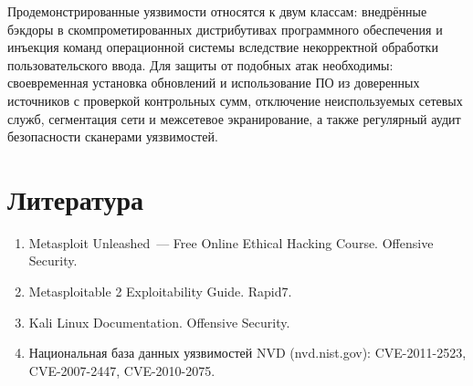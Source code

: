 \documentclass[a4paper,14pt]{extarticle}
\begin{document}
Продемонстрированные уязвимости относятся к двум классам: внедрённые бэкдоры в скомпрометированных дистрибутивах программного обеспечения и инъекция команд операционной системы вследствие некорректной обработки пользовательского ввода. Для защиты от подобных атак необходимы: своевременная установка обновлений и использование ПО из доверенных источников с проверкой контрольных сумм, отключение неиспользуемых сетевых служб, сегментация сети и межсетевое экранирование, а также регулярный аудит безопасности сканерами уязвимостей.

\section{Литература}

\begin{enumerate}
\item Metasploit Unleashed~--- Free Online Ethical Hacking Course. Offensive Security.
\item Metasploitable 2 Exploitability Guide. Rapid7.
\item Kali Linux Documentation. Offensive Security.
\item Национальная база данных уязвимостей NVD (nvd.nist.gov): CVE-2011-2523, CVE-2007-2447, CVE-2010-2075.
\end{enumerate}
\end{document}
